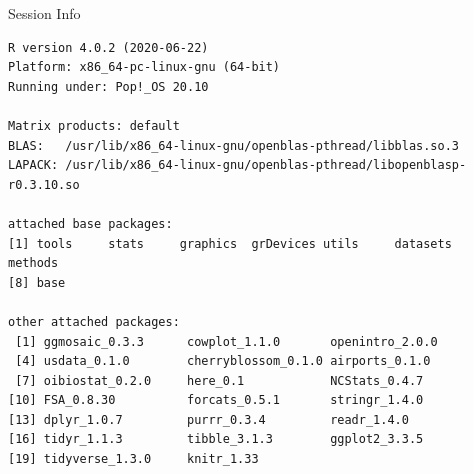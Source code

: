 \documentclass[10pt]{beamer}\usepackage[]{graphicx}\usepackage[]{color}
\makeatletter
\newenvironment{kframe}{%
 \def\at@end@of@kframe{}%
 \ifinner\ifhmode%
  \def\at@end@of@kframe{\end{minipage}}%
  \begin{minipage}{\columnwidth}%
 \fi\fi%
 \def\FrameCommand##1{\hskip\@totalleftmargin \hskip-\fboxsep
 \colorbox{shadecolor}{##1}\hskip-\fboxsep
     \hskip-\linewidth \hskip-\@totalleftmargin \hskip\columnwidth}%
 \MakeFramed {\advance\hsize-\width
   \@totalleftmargin\z@ \linewidth\hsize
   \@setminipage}}%
 {\par\unskip\endMakeFramed%
 \at@end@of@kframe}
\newenvironment{knitrout}{}{} %
\makeatother
\begin{document}
\begin{frame}[fragile]{Session Info}
	\tiny
	
\begin{knitrout}\tiny
{}\color{fgcolor}\begin{kframe}
\begin{verbatim}
R version 4.0.2 (2020-06-22)
Platform: x86_64-pc-linux-gnu (64-bit)
Running under: Pop!_OS 20.10

Matrix products: default
BLAS:   /usr/lib/x86_64-linux-gnu/openblas-pthread/libblas.so.3
LAPACK: /usr/lib/x86_64-linux-gnu/openblas-pthread/libopenblasp-r0.3.10.so

attached base packages:
[1] tools     stats     graphics  grDevices utils     datasets  methods  
[8] base     

other attached packages:
 [1] ggmosaic_0.3.3      cowplot_1.1.0       openintro_2.0.0    
 [4] usdata_0.1.0        cherryblossom_0.1.0 airports_0.1.0     
 [7] oibiostat_0.2.0     here_0.1            NCStats_0.4.7      
[10] FSA_0.8.30          forcats_0.5.1       stringr_1.4.0      
[13] dplyr_1.0.7         purrr_0.3.4         readr_1.4.0        
[16] tidyr_1.1.3         tibble_3.1.3        ggplot2_3.3.5      
[19] tidyverse_1.3.0     knitr_1.33         


\end{verbatim}
\end{kframe}
\end{knitrout}
\end{frame}
\end{document}
